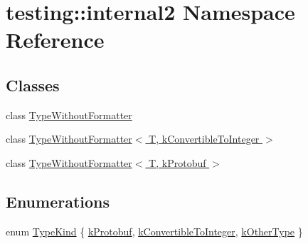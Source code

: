 \hypertarget{namespacetesting_1_1internal2}{}\section{testing\+:\+:internal2 Namespace Reference}
\label{namespacetesting_1_1internal2}
\subsection*{Classes}
\begin{DoxyCompactItemize}
\item 
class \hyperlink{classtesting_1_1internal2_1_1_type_without_formatter}{Type\+Without\+Formatter}
\item 
class \hyperlink{classtesting_1_1internal2_1_1_type_without_formatter_3_01_t_00_01k_convertible_to_integer_01_4}{Type\+Without\+Formatter$<$ T, k\+Convertible\+To\+Integer $>$}
\item 
class \hyperlink{classtesting_1_1internal2_1_1_type_without_formatter_3_01_t_00_01k_protobuf_01_4}{Type\+Without\+Formatter$<$ T, k\+Protobuf $>$}
\end{DoxyCompactItemize}
\subsection*{Enumerations}
\begin{DoxyCompactItemize}
\item 
enum \hyperlink{namespacetesting_1_1internal2_aeb8161b0b3ee503347b0662d7028fd57}{Type\+Kind} \{ \hyperlink{namespacetesting_1_1internal2_aeb8161b0b3ee503347b0662d7028fd57a14aaf98a2547ecf43eef0868d54b1383}{k\+Protobuf}, 
\hyperlink{namespacetesting_1_1internal2_aeb8161b0b3ee503347b0662d7028fd57a9bdcf3f1548f498b2b7f097306ea0224}{k\+Convertible\+To\+Integer}, 
\hyperlink{namespacetesting_1_1internal2_aeb8161b0b3ee503347b0662d7028fd57abe8aaea44751d6ebd0cdf5bd94451db1}{k\+Other\+Type}
 \}
\end{DoxyCompactItemize}
